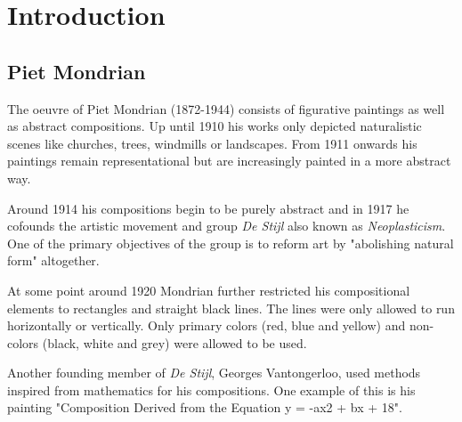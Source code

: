 \documentclass[serif,article,noparskip]{agse-thesis}
\begin{document}



\cleardoublepage

\tableofcontents

\cleardoublepage

\mainmatter

\section{Introduction}


\subsection{Piet Mondrian}

The oeuvre of Piet Mondrian (1872-1944) consists of figurative paintings as well
as abstract compositions. Up until 1910 his works only depicted naturalistic
scenes like churches, trees, windmills or landscapes. From 1911 onwards his
paintings remain representational but are increasingly painted in a more
abstract way.

Around 1914 his compositions begin to be purely abstract and in 1917 he cofounds
the artistic movement and group \textit{De Stijl} also known as
\textit{Neoplasticism}. One of the primary objectives of the group is to reform
art by "abolishing natural form" \cite{wiki:manifest} altogether.

At some point around 1920 Mondrian further restricted his compositional elements
to rectangles and straight black lines. The lines were only allowed to run
horizontally or vertically. Only primary colors (red, blue and yellow) and
non-colors (black, white and grey) were allowed to be used.

Another founding member of \textit{De Stijl}, Georges Vantongerloo, used methods
inspired from mathematics for his compositions. One example of this is his
painting "Composition Derived from the Equation y = -ax2 + bx + 18".
\end{document}
